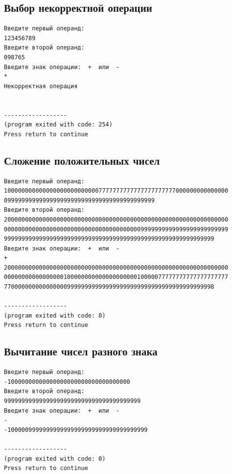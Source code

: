 \documentclass[a4paper,12pt]{article} %
\begin{document}
\subsection*{Выбор некорректной операции}
\begin{verbatim}
Введите первый операнд:
123456789
Введите второй операнд:
098765
Введите знак операции:  +  или  -
*
Некорректная операция


------------------
(program exited with code: 254)
Press return to continue
\end{verbatim}

\subsection*{Сложение положительных чисел}
\begin{verbatim}
Введите первый операнд:
1000000000000000000000000007777777777777777777777000000000000000
0999999999999999999999999999999999999999999
Введите второй операнд:
2000000000000000000000000000000000000000000000000000000000000000
0000000000000000000000000000000000000009999999999999999999999999
999999999999999999999999999999999999999999999999999999999999
Введите знак операции:  +  или  -
+
2000000000000000000000000000000000000000000000000000000000000000
0000000000000000010000000000000000000010000077777777777777777777
770000000000000000999999999999999999999999999999999999999998

------------------
(program exited with code: 0)
Press return to continue
\end{verbatim}

\subsection*{Вычитание чисел разного знака}
\begin{verbatim}
Введите первый операнд:
-10000000000000000000000000000000000
Введите второй операнд:
999999999999999999999999999999999999999
Введите знак операции:  +  или  -
-
-1000009999999999999999999999999999999999

------------------
(program exited with code: 0)
Press return to continue
\end{verbatim}

\printbibliography
\end{document}
